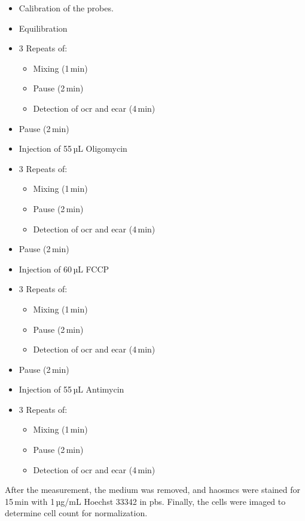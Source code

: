     \begin{itemize}
        \item Calibration of the probes.
        \item Equilibration
        \item 3 Repeats of:
        \begin{itemize}
            \item Mixing (1\,min)
            \item Pause (2\,min)
            \item Detection of \ac{ocr} and \ac{ecar} (4\,min)
        \end{itemize}
        \item Pause (2\,min)
        \item Injection of 55\,µL Oligomycin
        \item 3 Repeats of:
        \begin{itemize}
            \item Mixing (1\,min)
            \item Pause (2\,min)
            \item Detection of \ac{ocr} and \ac{ecar} (4\,min)
        \end{itemize}
        \item Pause (2\,min)
        \item Injection of 60\,µL FCCP
        \item 3 Repeats of:
        \begin{itemize}
            \item Mixing (1\,min)
            \item Pause (2\,min)
            \item Detection of \ac{ocr} and \ac{ecar} (4\,min)
        \end{itemize}
        \item Pause (2\,min)
        \item Injection of 55\,µL Antimycin
        \item 3 Repeats of:
        \begin{itemize}
            \item Mixing (1\,min)
            \item Pause (2\,min)
            \item Detection of \ac{ocr} and \ac{ecar} (4\,min)
        \end{itemize}
    \end{itemize}

    After the measurement, the medium was removed, and \acp{haosmc} were stained for 15\,min with 1\,µg/mL Hoechst 33342 in \ac{pbs}. Finally, the cells were imaged to determine cell count for normalization.


